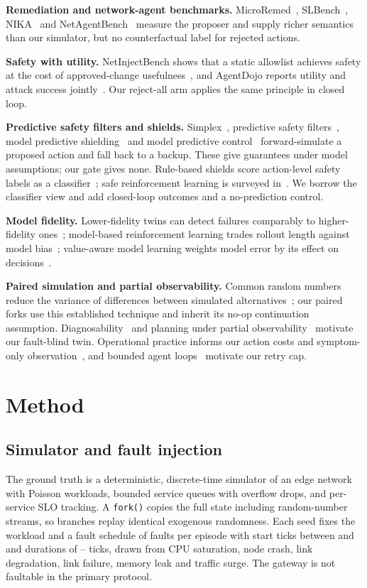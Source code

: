 \documentclass[conference]{IEEEtran}
\begin{document}
\textbf{Remediation and network-agent benchmarks.} MicroRemed~\cite{microremed}, SLBench~\cite{slbench}, NIKA~\cite{nika} and NetAgentBench~\cite{netagentbench} measure the proposer and supply richer semantics than our simulator, but no counterfactual label for rejected actions.

\textbf{Safety with utility.} NetInjectBench shows that a static allowlist achieves safety at the cost of approved-change usefulness~\cite{netinjectbench}, and AgentDojo reports utility and attack success jointly~\cite{agentdojo}. Our reject-all arm applies the same principle in closed loop.

\textbf{Predictive safety filters and shields.} Simplex~\cite{simplex}, predictive safety filters~\cite{wabersich}, model predictive shielding~\cite{mps,robustmps} and model predictive control~\cite{rawlings} forward-simulate a proposed action and fall back to a backup. These give guarantees under model assumptions; our gate gives none. Rule-based shields score action-level safety labels as a classifier~\cite{rulebasedshield}; safe reinforcement learning is surveyed in~\cite{saferlsurvey}. We borrow the classifier view and add closed-loop outcomes and a no-prediction control.

\textbf{Model fidelity.} Lower-fidelity twins can detect failures comparably to higher-fidelity ones~\cite{fidelityam}; model-based reinforcement learning trades rollout length against model bias~\cite{mbpo}; value-aware model learning weights model error by its effect on decisions~\cite{vaml}.

\textbf{Paired simulation and partial observability.} Common random numbers reduce the variance of differences between simulated alternatives~\cite{crn,yadav}; our paired forks use this established technique and inherit its no-op continuation assumption. Diagnosability~\cite{sampath,cabasino} and planning under partial observability~\cite{pomcp} motivate our fault-blind twin. Operational practice informs our action costs and symptom-only observation~\cite{k8scontroller,k8shpa,sre_cascade,sre_monitoring}, and bounded agent loops~\cite{budgetaware,langgraph} motivate our retry cap.

\section{Method}
\subsection{Simulator and fault injection}
The ground truth is a deterministic, discrete-time simulator of an edge network with Poisson workloads, bounded service queues with overflow drops, and per-service SLO tracking. A \texttt{fork()} copies the full state including random-number streams, so branches replay identical exogenous randomness. Each seed fixes the workload and a fault schedule of \FaultsPerEpisode{} faults per episode with start ticks between \FaultStartMin{} and \FaultStartMax{} and durations of \FaultDurMin{}--\FaultDurMax{} ticks, drawn from CPU saturation, node crash, link degradation, link failure, memory leak and traffic surge. The gateway is not faultable in the primary protocol.
\end{document}
